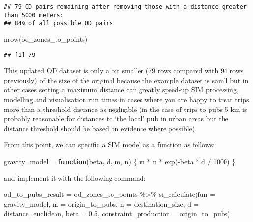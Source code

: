 \documentclass[11pt,letterpaper]{article}
\newenvironment{Shaded}{\begin{snugshade}}{\end{snugshade}}
\newcommand{\AttributeTok}[1]{\textcolor[rgb]{0.77,0.63,0.00}{#1}}
\newcommand{\ControlFlowTok}[1]{\textcolor[rgb]{0.13,0.29,0.53}{\textbf{#1}}}
\newcommand{\DecValTok}[1]{\textcolor[rgb]{0.00,0.00,0.81}{#1}}
\newcommand{\FloatTok}[1]{\textcolor[rgb]{0.00,0.00,0.81}{#1}}
\newcommand{\FunctionTok}[1]{\textcolor[rgb]{0.00,0.00,0.00}{#1}}
\newcommand{\NormalTok}[1]{#1}
\newcommand{\OtherTok}[1]{\textcolor[rgb]{0.56,0.35,0.01}{#1}}
\newcommand{\SpecialCharTok}[1]{\textcolor[rgb]{0.00,0.00,0.00}{#1}}
\begin{document}
\begin{verbatim}
## 79 OD pairs remaining after removing those with a distance greater than 5000 meters:
## 84% of all possible OD pairs
\end{verbatim}

\begin{Shaded}
\begin{Highlighting}[]
\FunctionTok{nrow}\NormalTok{(od\_zones\_to\_points)}
\end{Highlighting}
\end{Shaded}

\begin{verbatim}
## [1] 79
\end{verbatim}

This updated OD dataset is only a bit smaller (79 rows compared with 94 rows previously) of the size of the original because the example dataset is samll but in other cases setting a maximum distance can greatly speed-up SIM processing, modelling and visualisation run times in cases where you are happy to treat trips more than a threshold distance as negligible (in the case of trips to pubs 5 km is probably reasonable for distances to `the local' pub in urban areas but the distance threshold should be based on evidence where possible).

From this point, we can specific a SIM model as a function as follows:

\begin{Shaded}
\begin{Highlighting}[]
\NormalTok{gravity\_model }\OtherTok{=} \ControlFlowTok{function}\NormalTok{(beta, d, m, n) \{}
\NormalTok{  m }\SpecialCharTok{*}\NormalTok{ n }\SpecialCharTok{*} \FunctionTok{exp}\NormalTok{(}\SpecialCharTok{{-}}\NormalTok{beta }\SpecialCharTok{*}\NormalTok{ d }\SpecialCharTok{/} \DecValTok{1000}\NormalTok{)}
\NormalTok{\} }
\end{Highlighting}
\end{Shaded}

and implement it with the following command:

\begin{Shaded}
\begin{Highlighting}[]
\NormalTok{od\_to\_pubs\_result }\OtherTok{=}\NormalTok{ od\_zones\_to\_points }\SpecialCharTok{\%\textgreater{}\%} 
  \FunctionTok{si\_calculate}\NormalTok{(}\AttributeTok{fun =}\NormalTok{ gravity\_model, }
               \AttributeTok{m =}\NormalTok{ origin\_to\_pubs,}
               \AttributeTok{n =}\NormalTok{ destination\_size,}
               \AttributeTok{d =}\NormalTok{ distance\_euclidean,}
               \AttributeTok{beta =} \FloatTok{0.5}\NormalTok{,}
               \AttributeTok{constraint\_production =}\NormalTok{ origin\_to\_pubs)}
\end{Highlighting}
\end{Shaded}
\end{document}
